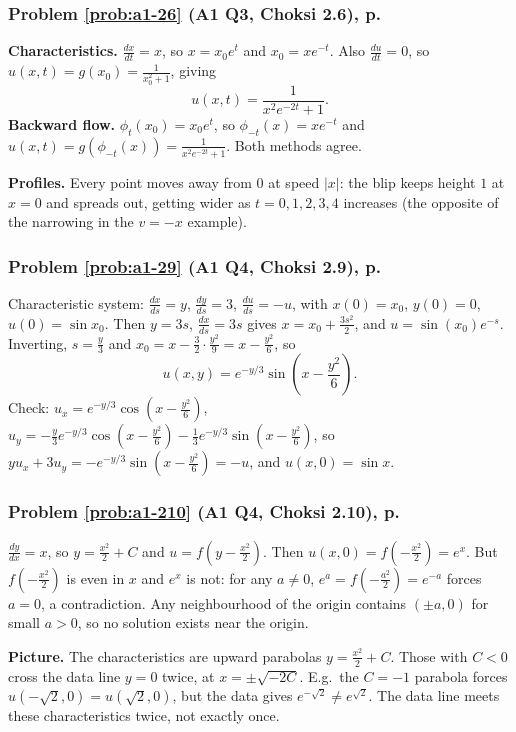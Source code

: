 \documentclass{article}
\begin{document}
\label{sol:a1-26}
\subsubsection*{Problem \ref{prob:a1-26} (A1 Q3, Choksi 2.6), p.~\pageref{prob:a1-26}}
\textbf{Characteristics.} $\frac{dx}{dt} = x$, so $x = x_0e^t$ and $x_0 = xe^{-t}$. Also $\frac{du}{dt} = 0$, so $u(x,t) = g(x_0) = \frac{1}{x_0^2 + 1}$, giving
\begin{equation*}
    u(x,t) = \frac{1}{x^2e^{-2t} + 1}.
\end{equation*}
\textbf{Backward flow.} $\phi_t(x_0) = x_0e^t$, so $\phi_{-t}(x) = xe^{-t}$ and $u(x,t) = g(\phi_{-t}(x)) = \frac{1}{x^2e^{-2t}+1}$. Both methods agree.\par
\textbf{Profiles.} Every point moves away from $0$ at speed $|x|$: the blip keeps height $1$ at $x = 0$ and spreads out, getting wider as $t = 0, 1, 2, 3, 4$ increases (the opposite of the narrowing in the $v = -x$ example).

\label{sol:a1-29}
\subsubsection*{Problem \ref{prob:a1-29} (A1 Q4, Choksi 2.9), p.~\pageref{prob:a1-29}}
Characteristic system: $\frac{dx}{ds} = y$, $\frac{dy}{ds} = 3$, $\frac{du}{ds} = -u$, with $x(0) = x_0$, $y(0) = 0$, $u(0) = \sin x_0$. Then $y = 3s$, $\frac{dx}{ds} = 3s$ gives $x = x_0 + \frac{3s^2}{2}$, and $u = \sin(x_0)e^{-s}$. Inverting, $s = \frac y3$ and $x_0 = x - \frac32\cdot\frac{y^2}{9} = x - \frac{y^2}{6}$, so
\begin{equation*}
    u(x,y) = e^{-y/3}\sin\left(x - \frac{y^2}{6}\right).
\end{equation*}
Check: $u_x = e^{-y/3}\cos(x - \frac{y^2}{6})$, $u_y = -\frac y3e^{-y/3}\cos(x - \frac{y^2}{6}) - \frac13e^{-y/3}\sin(x - \frac{y^2}{6})$, so $yu_x + 3u_y = -e^{-y/3}\sin(x - \frac{y^2}{6}) = -u$, and $u(x,0) = \sin x$.

\label{sol:a1-210}
\subsubsection*{Problem \ref{prob:a1-210} (A1 Q4, Choksi 2.10), p.~\pageref{prob:a1-210}}
$\frac{dy}{dx} = x$, so $y = \frac{x^2}{2} + C$ and $u = f(y - \frac{x^2}{2})$. Then $u(x,0) = f(-\frac{x^2}{2}) = e^x$. But $f(-\frac{x^2}{2})$ is even in $x$ and $e^x$ is not: for any $a \neq 0$, $e^a = f(-\frac{a^2}{2}) = e^{-a}$ forces $a = 0$, a contradiction. Any neighbourhood of the origin contains $(\pm a, 0)$ for small $a > 0$, so no solution exists near the origin.\par
\textbf{Picture.} The characteristics are upward parabolas $y = \frac{x^2}{2} + C$. Those with $C < 0$ cross the data line $y = 0$ twice, at $x = \pm\sqrt{-2C}$. E.g.\ the $C = -1$ parabola forces $u(-\sqrt2,0) = u(\sqrt2,0)$, but the data gives $e^{-\sqrt2} \neq e^{\sqrt2}$. The data line meets these characteristics twice, not exactly once.
\end{document}
